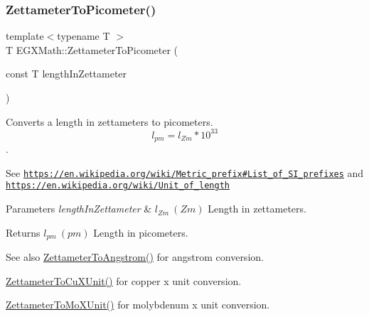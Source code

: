\subsubsection{\texorpdfstring{Zettameter\+To\+Picometer()}{ZettameterToPicometer()}}
{\footnotesize\ttfamily template$<$typename T $>$ \\
T E\+G\+X\+Math\+::\+Zettameter\+To\+Picometer (\begin{DoxyParamCaption}\item[{const T}]{length\+In\+Zettameter }\end{DoxyParamCaption})}



Converts a length in zettameters to picometers. \[ l_{pm}=l_{Zm} * 10^{33} \]. 

See \href{https://en.wikipedia.org/wiki/Metric_prefix#List_of_SI_prefixes}{\tt https\+://en.\+wikipedia.\+org/wiki/\+Metric\+\_\+prefix\#\+List\+\_\+of\+\_\+\+S\+I\+\_\+prefixes} and \href{https://en.wikipedia.org/wiki/Unit_of_length}{\tt https\+://en.\+wikipedia.\+org/wiki/\+Unit\+\_\+of\+\_\+length} 
\begin{DoxyParams}{Parameters}
{\em length\+In\+Zettameter} & $ l_{Zm}\ (Zm)$ Length in zettameters. \\
\hline
\end{DoxyParams}
\begin{DoxyReturn}{Returns}
$ l_{pm}\ (pm)$ Length in picometers. 
\end{DoxyReturn}
\begin{DoxySeeAlso}{See also}
\mbox{\hyperlink{group___e_g_x_math-_conversions-_length_conversions-_zettameter-_non-_s_i_ga49d813ff9592fc1fc9a184436d0849fc}{Zettameter\+To\+Angstrom()}} for angstrom conversion. 

\mbox{\hyperlink{group___e_g_x_math-_conversions-_length_conversions-_zettameter-_non-_s_i_ga91f2890d91086a45ad9d2b5e7e82b60a}{Zettameter\+To\+Cu\+X\+Unit()}} for copper x unit conversion. 

\mbox{\hyperlink{group___e_g_x_math-_conversions-_length_conversions-_zettameter-_non-_s_i_ga10039261b7de3417e69110a56312b9ef}{Zettameter\+To\+Mo\+X\+Unit()}} for molybdenum x unit conversion. 
\end{DoxySeeAlso}
\mbox{\label{group___e_g_x_math-_conversions-_length_conversions-_zettameter-_s_i_ga16dfe32824b09a16e5af4a6f663c0f38}} 
